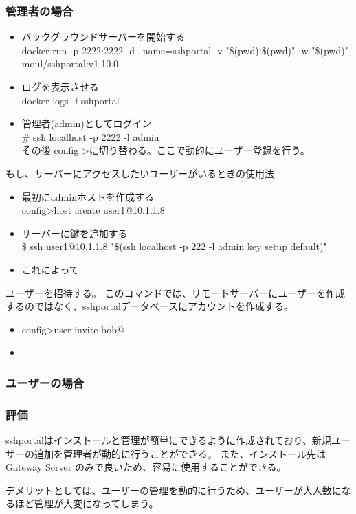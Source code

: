 \documentclass[12pt,a4paper,titlepage]{jsarticle}
\begin{document}
\subsubsection*{管理者の場合}
\begin{itemize}

    \item バックグラウンドサーバーを開始する \mbox{}\\docker run -p 2222:2222 -d --name=sshportal -v "\$(pwd):\$(pwd)" -w "\$(pwd)" 
    moul/sshportal:v1.10.0
    \item ログを表示させる\mbox{}\\docker logs -f sshportal
    \item 管理者(admin)としてログイン\mbox{}\\ \# ssh localhost -p 2222 -l admin\\その後 config \textgreater に切り替わる。ここで動的にユーザー登録を行う。
    
\end{itemize}
もし、サーバーにアクセスしたいユーザーがいるときの使用法
\begin{itemize}
    \item 最初にadminホストを作成する\mbox{}\\ config\textgreater  host create user1@10.1.1.8
    \item サーバーに鍵を追加する\mbox{} \\ \$ ssh user1@10.1.1.8 "\$(ssh localhost -p 222 -l admin key setup default)"
    \item これによって
\end{itemize}
ユーザーを招待する。
このコマンドでは、リモートサーバーにユーザーを作成するのではなく、sshportalデータベースにアカウントを作成する。
\begin{itemize}
    \item config\textgreater user invite bob@
    \item 
\end{itemize}


\subsubsection*{ユーザーの場合}


\subsubsection*{評価}
sshportalはインストールと管理が簡単にできるように作成されており、新規ユーザーの追加を管理者が動的に行うことができる。
また、インストール先はGateway Server のみで良いため、容易に使用することができる。
\par デメリットとしては、ユーザーの管理を動的に行うため、ユーザーが大人数になるほど管理が大変になってしまう。
\end{document}
